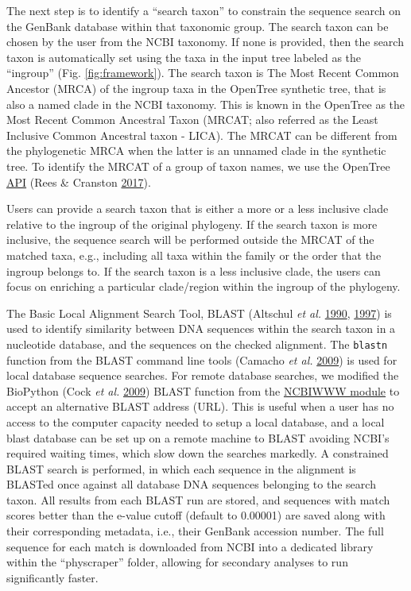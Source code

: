 \documentclass[]{article}
\begin{document}
The next step is to identify a ``search taxon'' to constrain the sequence search on the GenBank database within that taxonomic group.
The search taxon can be chosen by the user from the NCBI taxonomy.
If none is provided, then the search taxon is automatically set using the taxa in the input tree labeled as the ``ingroup'' (Fig. \ref{fig:framework}).
The search taxon is The Most Recent Common Ancestor (MRCA) of the ingroup taxa in the OpenTree synthetic tree, that is also a named clade in the NCBI taxonomy.
This is known in the OpenTree as the Most Recent Common
Ancestral Taxon (MRCAT; also referred as the Least Inclusive Common Ancestral taxon - LICA).
The MRCAT can be different from the phylogenetic MRCA when the latter is an unnamed clade in the synthetic tree.
To identify the MRCAT of a group of taxon names, we use the OpenTree \href{https://github.com/OpenTreeOfLife/germinator/wiki/Taxonomy-API-v3\#mrca}{API} (Rees \& Cranston \protect\hyperlink{ref-rees2017automated}{2017}).

Users can provide a search taxon that is either a more or a less inclusive
clade relative to the ingroup of the original phylogeny. If the search taxon is more inclusive, the sequence search will be performed outside the MRCAT of the matched taxa, e.g., including all taxa within
the family or the order that the ingroup belongs to. If the search taxon is a less inclusive clade, the users can focus on enriching a particular clade/region within the ingroup of the phylogeny.

The Basic Local Alignment Search Tool, BLAST (Altschul \emph{et al.} \protect\hyperlink{ref-altschul1990basic}{1990}, \protect\hyperlink{ref-altschul1997gapped}{1997}) is used to identify
similarity between DNA sequences within the search taxon in a nucleotide
database, and the sequences on the checked alignment.
The \texttt{blastn} function from the BLAST command line tools (Camacho \emph{et al.} \protect\hyperlink{ref-camacho2009blast}{2009}) is used for local database sequence searches.
For remote database searches, we modified the BioPython (Cock \emph{et al.} \protect\hyperlink{ref-cock2009biopython}{2009}) BLAST function from the \href{https://biopython.org/DIST/docs/api/Bio.Blast.NCBIWWW-module.html}{NCBIWWW module} to accept an alternative BLAST address (URL). This is useful when a user has no access to the computer capacity needed to setup a local database, and a local blast database can be set up on a remote machine to BLAST avoiding NCBI's required waiting times, which slow down the searches markedly.
A constrained BLAST search is performed, in which each sequence
in the alignment is BLASTed once against all database DNA sequences belonging to the search
taxon. All results from each BLAST run are stored, and sequences with match scores better than the e-value cutoff (default to 0.00001) are saved
along with their corresponding metadata, i.e., their GenBank accession number.
The full sequence for each match is downloaded from NCBI into a dedicated library within the ``physcraper'' folder, allowing for secondary analyses to run significantly faster.
\end{document}
